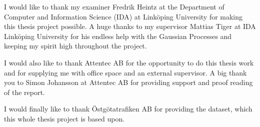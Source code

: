 I would like to thank my examiner Fredrik Heintz  at the Department of Computer and Information Science (IDA) at Linköping University for making this thesis project possible.
A huge thanks to my supervisor Mattias Tiger at IDA Linköping University for his endless help with the Gaussian Processes and keeping my spirit high throughout the project.

I would also like to thank Attentec AB for the opportunity to do this thesis work and for supplying me with office space and an external supervisor.
A big thank you to Simon Johansson at Attentec AB for providing support and proof reading of the report.

I would finally like to thank Östgötatrafiken AB for providing the dataset, which this whole thesis project is based upon.
